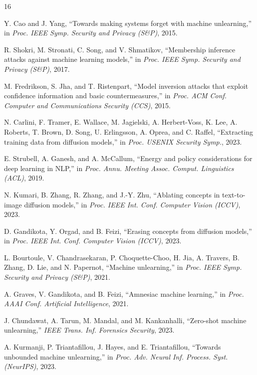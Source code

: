 \documentclass[conference]{IEEEtran}
\begin{document}
\begin{thebibliography}{16}

Y. Cao and J. Yang, “Towards making systems forget with machine unlearning,” in \textit{Proc. IEEE Symp. Security and Privacy (S\&P)}, 2015.

R. Shokri, M. Stronati, C. Song, and V. Shmatikov, “Membership inference attacks against machine learning models,” in \textit{Proc. IEEE Symp. Security and Privacy (S\&P)}, 2017.

M. Fredrikson, S. Jha, and T. Ristenpart, “Model inversion attacks that exploit confidence information and basic countermeasures,” in \textit{Proc. ACM Conf. Computer and Communications Security (CCS)}, 2015.

N. Carlini, F. Tramer, E. Wallace, M. Jagielski, A. Herbert-Voss, K. Lee, A. Roberts, T. Brown, D. Song, U. Erlingsson, A. Oprea, and C. Raffel, “Extracting training data from diffusion models,” in \textit{Proc. USENIX Security Symp.}, 2023.

E. Strubell, A. Ganesh, and A. McCallum, “Energy and policy considerations for deep learning in NLP,” in \textit{Proc. Annu. Meeting Assoc. Comput. Linguistics (ACL)}, 2019.

N. Kumari, B. Zhang, R. Zhang, and J.-Y. Zhu, “Ablating concepts in text-to-image diffusion models,” in \textit{Proc. IEEE Int. Conf. Computer Vision (ICCV)}, 2023.

D. Gandikota, Y. Orgad, and B. Feizi, “Erasing concepts from diffusion models,” in \textit{Proc. IEEE Int. Conf. Computer Vision (ICCV)}, 2023.

L. Bourtoule, V. Chandrasekaran, P. Choquette-Choo, H. Jia, A. Travers, B. Zhang, D. Lie, and N. Papernot, “Machine unlearning,” in \textit{Proc. IEEE Symp. Security and Privacy (S\&P)}, 2021.

A. Graves, V. Gandikota, and B. Feizi, “Amnesiac machine learning,” in \textit{Proc. AAAI Conf. Artificial Intelligence}, 2021.

J. Chundawat, A. Tarun, M. Mandal, and M. Kankanhalli, “Zero-shot machine unlearning,” \textit{IEEE Trans. Inf. Forensics Security}, 2023.

A. Kurmanji, P. Triantafillou, J. Hayes, and E. Triantafillou, “Towards unbounded machine unlearning,” in \textit{Proc. Adv. Neural Inf. Process. Syst. (NeurIPS)}, 2023.


\end{thebibliography}
\end{document}
